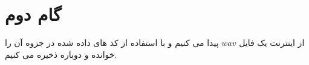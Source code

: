 \def \Subject {گام دوم}


\section{\Subject}




از اینترنت یک فایل 
\(wav\)
پیدا می کنیم و با استفاده از کد های داده شده در جزوه آن را خوانده و دوباره ذخیره می کنیم.

\begin{latin}
    \inputminted[frame=none]{csharp}{s_2.cs}
\end{latin}
